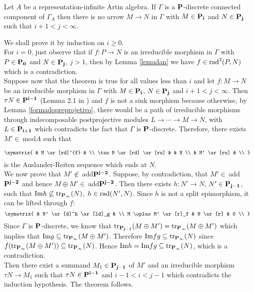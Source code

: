 \begin{thm}
\label{theotodorov}
Let $A$ be a representation-infinite Artin algebra. If $\Gamma$ is a $\bf{P}$-discrete connected component of $\Gamma_A$
then there is no arrow $ M \rightarrow N$ in $\Gamma$ with $M \in \bf{P_i}$ and $N \in \bf{P_j}$ such that $i+1<j<{\infty}$.
\end{thm}
\begin{pf}
We shall prove it by induction on $i \geq 0$. \\
For $i = 0$, just observe that if $f: P \rightarrow N$ is an irreducible morphism in $\Gamma$ with $P \in \bf{P_0}$ and $N \in \bf{P_j}$, $j>1$, then by Lemma \ref{lemadan} we have $f \in {\rm rad}^2(P,N)$ which is a contradiction.\\
Suppose now that the theorem is true for all values less than $i$ and let  $f:M \rightarrow N$ be an irreducible morphism in $\Gamma$ with $M \in \bf{P_i}$, $N \in \bf{P_j}$ and $i+1<j<{\infty}$. Then $\tau N \in {\bf P^{i-1}}$ (Lemma 2.1 in \cite{coelho1}) and $f$ is not a sink morphism because otherwise, by Lemma \ref{formadopreprojetivo}, there would be a path of irreducible morphisms through indecomposable postprojective modules $L \rightarrow \cdots \rightarrow M \rightarrow N$, with $L \in \bf{P_{i+1}}$ which contradicts the fact that $\Gamma$ is ${\bf P}$-discrete. Therefore, there exists $M' \in \ $mod$A$ such that

$$\xymatrix{
            & M \ar[rd]^{f} &  \\
  \tau N \ar[rd] \ar[ru] &    & N \\ 
            & M' \ar[ru] &    \\
}$$
is the Auslander-Reiten sequence which ends at $N$.\\
We now prove that $M' \not\in \ $add$\bf{P^{j-2}}$. Suppose, by contradiction, that $M' \in \ $add$\bf{P^{j-2}}$ and hence $M \oplus M' \in \ $add$\bf{P^{j-2}}$. Then there exists $h: N' \rightarrow N$, $N' \in \bf{P_{j-1}}$, such that ${\rm Im}h \not\subseteq {\rm tr}_{\bf P_{\infty}}(N)$, $h \in {\rm rad}(N',N)$. Since $h$ is not a split epimorphism, it can be lifted through $f$: 
$$\xymatrix{
  & N' \ar[d]^h \ar[ld]_g & \\
M \oplus M' \ar[r]_f & N \ar[r]  &  0 \\
}$$
Since $\Gamma$ is ${\bf P}$-discrete, we know that ${\rm tr}_{\bf P_{j-1}}(M \oplus M')={\rm tr}_{\bf P_{\infty}}(M \oplus M')$ which implies 
that ${\rm Im}g \subseteq {\rm tr}_{\bf P_{\infty}}(M \oplus M')$. Therefore ${\rm Im}fg \subseteq {\rm tr}_{\bf P_{\infty}}(N)$ since $f({\rm tr}_{\bf P_{\infty}}(M \oplus M')) \subseteq {\rm tr}_{\bf P_{\infty}}(N)$. Hence ${\rm Im}h = {\rm Im}fg \subseteq {\rm tr}_{\bf P_{\infty}}(N)$, which is a contradiction. \\
Then there exist a summand $M_1 \in \bf{P_{j-1}}$ of $M'$ and an irreducible morphism $\tau N \rightarrow M_1$ such that $ \tau N \in \bf{P^{i-1}}$ and $i-1<i<j-1$ which contradicts the induction hypothesis. The theorem follows.
\end{pf}

